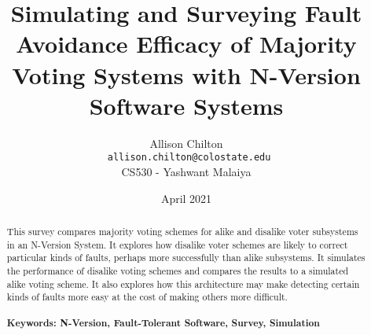 \documentclass[article]{IEEEtran}
\begin{document}
\title{Simulating and Surveying Fault Avoidance Efficacy of Majority Voting Systems with N-Version Software Systems}
\author{Allison Chilton\\\texttt{ allison.chilton@colostate.edu}\\CS530 - Yashwant Malaiya}
\date{April 2021}

\maketitle


\begin{abstract}
This survey compares majority voting schemes for alike and disalike voter subsystems in an N-Version System. It explores how disalike voter schemes are likely to correct particular kinds of faults, perhaps more successfully than alike subsystems. It simulates the performance of disalike voting schemes and compares the results to a simulated alike voting scheme. It also explores how this architecture may make detecting certain kinds of faults more easy at the cost of making others more difficult.
\hfill\\\\
\textbf{Keywords: N-Version, Fault-Tolerant Software, Survey, Simulation}
\end{abstract}
\end{document}
